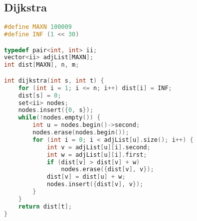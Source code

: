 \subsection{Dijkstra}
\begin{lstlisting}[language=C++]
#define MAXN 100009
#define INF (1 << 30)

typedef pair<int, int> ii;
vector<ii> adjList[MAXN];
int dist[MAXN], n, m;

int dijkstra(int s, int t) {
    for (int i = 1; i <= n; i++) dist[i] = INF; 
    dist[s] = 0;
    set<ii> nodes;
    nodes.insert({0, s});
    while(!nodes.empty()) {
        int u = nodes.begin()->second;
        nodes.erase(nodes.begin());
        for (int i = 0; i < adjList[u].size(); i++) {
            int v = adjList[u][i].second;
            int w = adjList[u][i].first;
            if (dist[v] > dist[v] + w)
                nodes.erase({dist[v], v});
            dist[v] = dist[u] + w;
            nodes.insert({dist[v], v});
        }
    }
    return dist[t];
}
\end{lstlisting}





\newpage